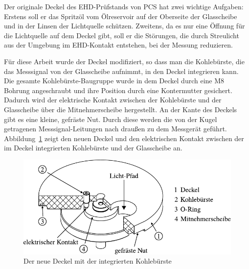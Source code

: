 Der originale Deckel des EHD-Prüfstands von PCS hat zwei wichtige Aufgaben:
Erstens soll er das Spritzöl vom Ölreservoir auf der Oberseite der Glasscheibe und in der Linsen der Lichtquelle schützen.
Zweitens, da es nur eine Öffnung für die Lichtquelle auf dem Deckel gibt, soll er die Störungen, die durch Streulicht aus der Umgebung im EHD-Kontakt entstehen, bei der Messung reduzieren.

Für diese Arbeit wurde der Deckel modifiziert, so dass man die Kohlebürste, die das Messsignal von der Glasscheibe aufnimmt, in den Deckel integrieren kann.
Die gesamte Kohlebürste-Baugruppe wurde in dem Deckel durch eine M8 Bohrung angeschraubt und ihre Position durch eine Kontermutter gesichert.
Dadurch wird der elektrische Kontakt zwischen der Kohlebürste und der Glasscheibe über die Mitnehmerscheibe hergestellt.
An der Kante des Deckels gibt es eine kleine, gefräste Nut.
Durch diese werden die von der Kugel getragenen Messsignal-Leitungen nach draußen zu dem Messgerät geführt.
Abbildung~\ref{fig:deckel_mit_kohlebuersten} zeigt den neuen Deckel und den elektrischen Kontakt zwischen der im Deckel integrierten Kohlebürste und der Glasscheibe an.

\begin{figure}[htb]
    \centering
    \includegraphics[]{./images/deckel_und_scheibe.pdf}
    \caption{Der neue Deckel mit der integrierten Kohlebürste}
    \label{fig:deckel_mit_kohlebuersten}
\end{figure}
